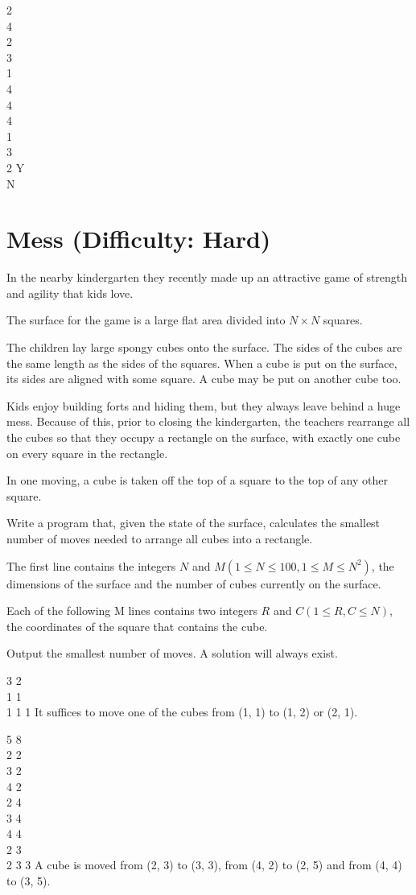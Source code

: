 \documentclass{problem-set}
\begin{document}
\addsample
{
2\\
4\\
2\\
3\\
1\\
4\\
4\\
4\\
1\\
3\\
2
}
{
Y\\
N
}

\section{Mess (Difficulty: Hard)}
In the nearby kindergarten they recently made up an attractive game of strength and agility that kids love.

The surface for the game is a large flat area divided into $N\times N$ squares.

The children lay large spongy cubes onto the surface. The sides of the cubes are the same length as the sides of the squares. When a cube is put on the surface, its sides are aligned with some square. A cube may be put on another cube too.

Kids enjoy building forts and hiding them, but they always leave behind a huge mess. Because of this, prior to closing the kindergarten, the teachers rearrange all the cubes so that they occupy a rectangle on the surface, with exactly one cube on every square in the rectangle.

In one moving, a cube is taken off the top of a square to the top of any other square.

Write a program that, given the state of the surface, calculates the smallest number of moves needed to arrange all cubes into a rectangle.

\pushnewpage

The first line contains the integers $N$ and $M (1\leq N\leq 100,1\leq M\leq N^2)$, the dimensions of the surface and the number of cubes currently on the surface.

Each of the following M lines contains two integers $R$ and $C (1\leq R,C\leq N)$, the coordinates of the square that contains the cube.

\outputformat
Output the smallest number of moves. A solution will always exist.

\addsampleExplanation
{
3 2\\
1 1\\
1 1
}
{
1
}
{
It suffices to move one of the cubes from (1, 1) to (1, 2) or (2, 1).
}

\pushnewpage

\addsampleExplanation
{
5 8\\
2 2\\
3 2\\
4 2\\
2 4\\
3 4\\
4 4\\
2 3\\
2 3
}
{
3
}
{
A cube is moved from (2, 3) to (3, 3), from (4, 2) to (2, 5) and from (4, 4) to (3, 5).
}
\end{document}
